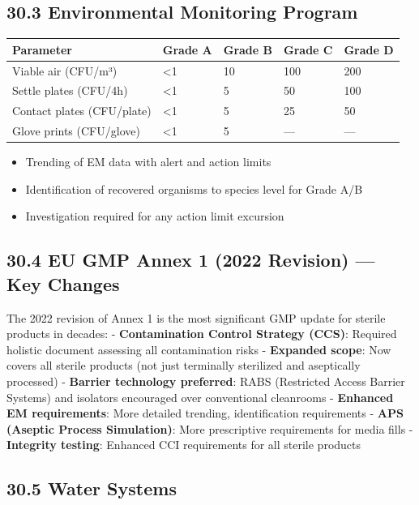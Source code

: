\documentclass[
  11pt,
  a4paper,
]{report}
\providecommand{\tightlist}{%
  \setlength{\itemsep}{0pt}\setlength{\parskip}{0pt}}
\begin{document}
\hypertarget{environmental-monitoring-program}{%
\subsection{30.3 Environmental Monitoring
Program}\label{environmental-monitoring-program}}

\begin{longtable}[]{@{}lllll@{}}
\toprule
Parameter & Grade A & Grade B & Grade C & Grade D\tabularnewline
\midrule
\endhead
Viable air (CFU/m³) & \textless1 & 10 & 100 & 200\tabularnewline
Settle plates (CFU/4h) & \textless1 & 5 & 50 & 100\tabularnewline
Contact plates (CFU/plate) & \textless1 & 5 & 25 & 50\tabularnewline
Glove prints (CFU/glove) & \textless1 & 5 & --- & ---\tabularnewline
\bottomrule
\end{longtable}

\begin{itemize}
\tightlist
\item
  Trending of EM data with alert and action limits
\item
  Identification of recovered organisms to species level for Grade A/B
\item
  Investigation required for any action limit excursion
\end{itemize}

\hypertarget{eu-gmp-annex-1-2022-revision-key-changes}{%
\subsection{30.4 EU GMP Annex 1 (2022 Revision) --- Key
Changes}\label{eu-gmp-annex-1-2022-revision-key-changes}}

The 2022 revision of Annex 1 is the most significant GMP update for
sterile products in decades: - \textbf{Contamination Control Strategy
(CCS)}: Required holistic document assessing all contamination risks -
\textbf{Expanded scope}: Now covers all sterile products (not just
terminally sterilized and aseptically processed) - \textbf{Barrier
technology preferred}: RABS (Restricted Access Barrier Systems) and
isolators encouraged over conventional cleanrooms - \textbf{Enhanced EM
requirements}: More detailed trending, identification requirements -
\textbf{APS (Aseptic Process Simulation)}: More prescriptive
requirements for media fills - \textbf{Integrity testing}: Enhanced CCI
requirements for all sterile products

\hypertarget{water-systems-1}{%
\subsection{30.5 Water Systems}\label{water-systems-1}}
\end{document}
